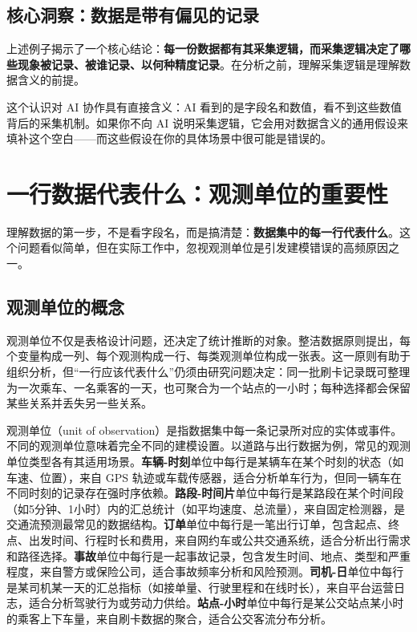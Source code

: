 \subsection{核心洞察：数据是带有偏见的记录}

上述例子揭示了一个核心结论：\textbf{每一份数据都有其采集逻辑，而采集逻辑决定了哪些现象被记录、被谁记录、以何种精度记录}。在分析之前，理解采集逻辑是理解数据含义的前提。

这个认识对 AI 协作具有直接含义：AI 看到的是字段名和数值，看不到这些数值背后的采集机制。如果你不向 AI 说明采集逻辑，它会用对数据含义的通用假设来填补这个空白——而这些假设在你的具体场景中很可能是错误的。

\section{一行数据代表什么：观测单位的重要性}

理解数据的第一步，不是看字段名，而是搞清楚：\textbf{数据集中的每一行代表什么}。这个问题看似简单，但在实际工作中，忽视观测单位是引发建模错误的高频原因之一。

\subsection{观测单位的概念}

观测单位不仅是表格设计问题，还决定了统计推断的对象。整洁数据原则提出，每个变量构成一列、每个观测构成一行、每类观测单位构成一张表\cite{wickham2014tidy}。这一原则有助于组织分析，但“一行应该代表什么”仍须由研究问题决定：同一批刷卡记录既可整理为一次乘车、一名乘客的一天，也可聚合为一个站点的一小时；每种选择都会保留某些关系并丢失另一些关系。

观测单位（unit of observation）是指数据集中每一条记录所对应的实体或事件。不同的观测单位意味着完全不同的建模设置。以道路与出行数据为例，常见的观测单位类型各有其适用场景。\textbf{车辆-时刻}单位中每行是某辆车在某个时刻的状态（如车速、位置），来自 GPS 轨迹或车载传感器，适合分析单车行为，但同一辆车在不同时刻的记录存在强时序依赖。\textbf{路段-时间片}单位中每行是某路段在某个时间段（如5分钟、1小时）内的汇总统计（如平均速度、总流量），来自固定检测器，是交通流预测最常见的数据结构。\textbf{订单}单位中每行是一笔出行订单，包含起点、终点、出发时间、行程时长和费用，来自网约车或公共交通系统，适合分析出行需求和路径选择。\textbf{事故}单位中每行是一起事故记录，包含发生时间、地点、类型和严重程度，来自警方或保险公司，适合事故频率分析和风险预测。\textbf{司机-日}单位中每行是某司机某一天的汇总指标（如接单量、行驶里程和在线时长），来自平台运营日志，适合分析驾驶行为或劳动力供给。\textbf{站点-小时}单位中每行是某公交站点某小时的乘客上下车量，来自刷卡数据的聚合，适合公交客流分布分析。


